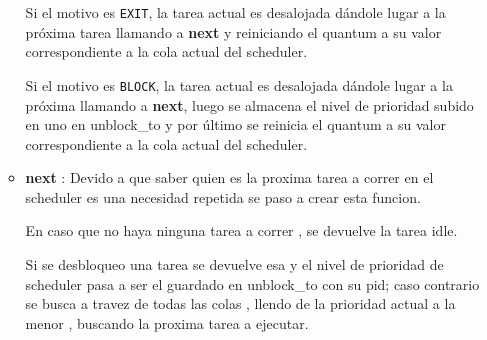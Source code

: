 \begin{itemize}
\begin{itemize}
				Si el motivo es \texttt{EXIT}, la tarea actual es desalojada dándole lugar a la próxima tarea llamando a \textbf{next} y reiniciando el quantum a su valor correspondiente a la cola actual del scheduler.
				
				Si el motivo es \texttt{BLOCK}, la tarea actual es desalojada dándole lugar a la próxima llamando a \textbf{next}, luego se almacena el nivel de prioridad subido en uno en unblock\_to  y por último se  reinicia el quantum a su valor correspondiente a la cola actual del scheduler.

				\item \textbf{next} : Devido a que saber quien es la proxima tarea a correr en el scheduler es una necesidad repetida se paso a crear esta funcion.
				
				En caso que no haya ninguna tarea a correr , se devuelve la tarea idle.
				
				Si se desbloqueo una tarea se devuelve esa y el nivel de prioridad de scheduler pasa a ser el guardado en unblock\_to con su pid; caso contrario se busca a travez de todas las colas , llendo de la prioridad actual a la menor , buscando la proxima tarea a ejecutar.

			\end{itemize}
	\end{itemize}




